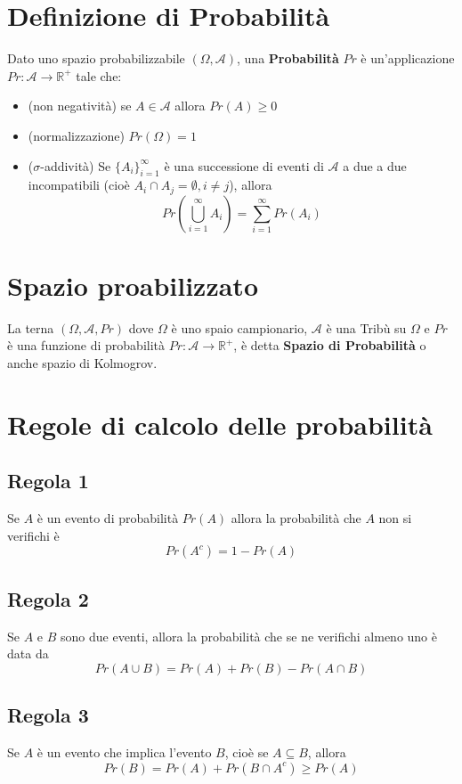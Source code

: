\documentclass[a4paper]{report}
\begin{document}
  \section{Definizione di Probabilità}
  Dato uno spazio probabilizzabile $(\Omega,\mathcal{A})$, una \textbf{Probabilità} $Pr$ è un'applicazione $Pr:\mathcal{A} \longrightarrow \mathbb{R}^+$ tale che:
  \begin{itemize}
    \item (non negatività) se $A \in \mathcal{A}$ allora $Pr(A) \geq 0$
    \item (normalizzazione) $Pr(\Omega) = 1$
    \item ($\sigma$-addività) Se ${\{A_i\}}_{i=1}^{\infty}$ è una successione di eventi di $\mathcal{A}$ a due a due incompatibili (cioè $A_i \cap A_j = \emptyset, i \neq j$), allora
    \[ Pr(\bigcup\limits_{i=1}^{\infty} A_i) = \sum_{i=1}^{\infty} Pr(A_i) \]
  \end{itemize}

  \section{Spazio proabilizzato}
  La terna $(\Omega, \mathcal{A}, Pr)$ dove $\Omega$ è uno spaio campionario, $\mathcal{A}$ è una Tribù su $\Omega$ e $Pr$ è una funzione di probabilità $Pr\colon \mathcal{A} \longrightarrow \mathbb{R^+}$, è detta \textbf{Spazio di Probabilità} o anche spazio di Kolmogrov.

  \section{Regole di calcolo delle probabilità}
  \subsection{Regola 1}
  Se $A$ è un evento di probabilità $Pr(A)$ allora la probabilità che $A$ non si verifichi è
  \[ Pr(A^c)=1-Pr(A) \]

  \subsection{Regola 2}
  Se $A$ e $B$ sono due eventi, allora la probabilità che se ne verifichi almeno uno è data da
  \[ Pr(A \cup B) = Pr(A) + Pr(B) - Pr(A \cap B) \]

  \subsection{Regola 3}
  Se $A$ è un evento che implica l'evento $B$, cioè se $A \subseteq B$, allora
  \[ Pr(B) = Pr(A) + Pr(B \cap {A}^{c}) \geq Pr(A) \]
\end{document}
